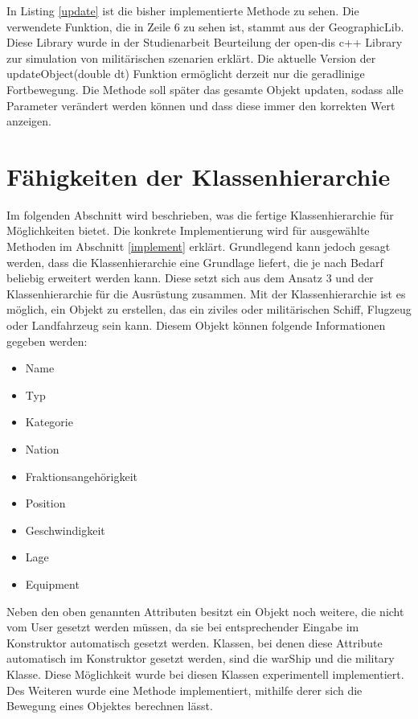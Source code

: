  In  Listing \ref{update} ist die bisher implementierte Methode zu sehen. Die verwendete Funktion, die in Zeile 6 zu sehen ist, stammt aus der GeographicLib. Diese Library wurde in der Studienarbeit \glqq Beurteilung der open-dis c++ Library zur simulation von militärischen szenarien\grqq{} \cite{HenryWinkel.} erklärt. Die aktuelle Version der  \glqq updateObject(double dt) \grqq{} Funktion ermöglicht derzeit nur die geradlinige Fortbewegung. Die Methode soll später das gesamte Objekt updaten, sodass alle Parameter verändert werden können und dass diese immer den korrekten Wert anzeigen.
 
 \section{Fähigkeiten der Klassenhierarchie}
Im folgenden Abschnitt wird beschrieben, was die fertige Klassenhierarchie für Möglichkeiten bietet. Die konkrete Implementierung wird für ausgewählte Methoden im Abschnitt \ref{implement} erklärt.
Grundlegend kann jedoch gesagt werden, dass die Klassenhierarchie eine Grundlage liefert, die je nach Bedarf beliebig erweitert werden kann.
Diese setzt sich aus dem Ansatz 3 und der Klassenhierarchie für die Ausrüstung zusammen. 
Mit der Klassenhierarchie ist es möglich, ein Objekt zu erstellen, das ein ziviles oder militärischen Schiff, Flugzeug oder Landfahrzeug sein kann. Diesem Objekt können folgende Informationen gegeben werden:
\begin{itemize}
	\singlespacing
	\item Name
	\item Typ
	\item Kategorie
	\item Nation
	\item Fraktionsangehörigkeit
	\item Position
	\item Geschwindigkeit
	\item Lage
	\item Equipment
\end{itemize}
Neben den oben genannten Attributen besitzt ein Objekt noch weitere, die nicht vom User gesetzt werden müssen, da sie bei entsprechender Eingabe im Konstruktor automatisch gesetzt werden. Klassen, bei denen diese Attribute automatisch im Konstruktor gesetzt werden, sind die \glqq warShip\grqq{} und die \glqq military\grqq{} Klasse. Diese Möglichkeit wurde bei diesen Klassen experimentell implementiert.
Des Weiteren wurde eine Methode implementiert, mithilfe derer sich die Bewegung eines Objektes berechnen lässt. \\
